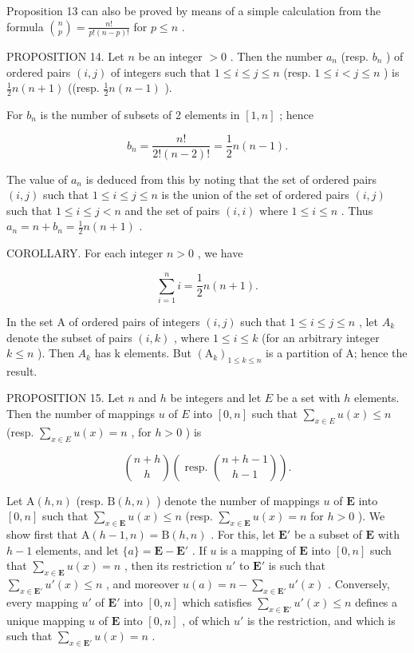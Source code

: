 Proposition 13 can also be proved by means of a simple calculation from the formula \(\binom{n}{p} = \frac{n!}{p!(n - p)!}\) for \(p \leqslant n\) .

PROPOSITION 14. Let \(n\) be an integer \(> 0\) . Then the number \(a_{n}\) (resp. \(b_{n}\) ) of ordered pairs \((i, j)\) of integers such that \(1 \leqslant i \leqslant j \leqslant n\) (resp. \(1 \leqslant i < j \leqslant n\) ) is \(\frac{1}{2} n(n + 1)\) ((resp. \(\frac{1}{2} n(n - 1)\) ).

For \(b_{n}\) is the number of subsets of 2 elements in \([1, n]\) ; hence

\[
b _ {n} = \frac {n !}{2 ! (n - 2) !} = \frac {1}{2} n (n - 1).
\]

The value of \(a_{n}\) is deduced from this by noting that the set of ordered pairs \((i, j)\) such that \(1 \leqslant i \leqslant j \leqslant n\) is the union of the set of ordered pairs \((i, j)\) such that \(1 \leqslant i \leqslant j < n\) and the set of pairs \((i, i)\) where \(1 \leqslant i \leqslant n\) . Thus \(a_{n} = n + b_{n} = \frac{1}{2} n(n + 1)\) .

COROLLARY. For each integer \(n > 0\) , we have

\[
\sum_ {i = 1} ^ {n} i = \frac {1}{2} n (n + 1).
\]

In the set A of ordered pairs of integers \((i, j)\) such that \(1 \leqslant i \leqslant j \leqslant n\) , let \(A_{k}\) denote the subset of pairs \((i, k)\) , where \(1 \leqslant i \leqslant k\) (for an arbitrary integer \(k \leqslant n\) ). Then \(A_{k}\) has k elements. But \((\mathrm{A}_{k})_{1 \leqslant k \leqslant n}\) is a partition of A; hence the result.

PROPOSITION 15. Let \(n\) and \(h\) be integers and let \(E\) be a set with \(h\) elements. Then the number of mappings \(u\) of \(E\) into \([0, n]\) such that \(\sum_{x \in E} u(x) \leqslant n\) (resp. \(\sum_{x \in E} u(x) = n\) , for \(h > 0\) ) is

\[
\binom {n + h} {h} \left(\text { resp. } \binom {n + h - 1} {h - 1}\right).
\]

Let \(\mathrm{A}(h, n)\) (resp. \(\mathrm{B}(h, n)\) ) denote the number of mappings \(u\) of \(\mathbf{E}\) into \([0, n]\) such that \(\sum_{x \in \mathbf{E}} u(x) \leqslant n\) (resp. \(\sum_{x \in \mathbf{E}} u(x) = n\) for \(h > 0\) ). We show first that \(\mathrm{A}(h - 1, n) = \mathrm{B}(h, n)\) . For this, let \(\mathbf{E}'\) be a subset of \(\mathbf{E}\) with \(h - 1\) elements, and let \(\{a\} = \mathbf{E} - \mathbf{E}'\) . If \(u\) is a mapping of \(\mathbf{E}\) into \([0, n]\) such that \(\sum_{x \in \mathbf{E}} u(x) = n\) , then its restriction \(u'\) to \(\mathbf{E}'\) is such that \(\sum_{x \in \mathbf{E}'} u'(x) \leqslant n\) , and moreover \(u(a) = n - \sum_{x \in \mathbf{E}'} u'(x)\) . Conversely, every mapping \(u'\) of \(\mathbf{E}'\) into \([0, n]\) which satisfies \(\sum_{x \in \mathbf{E}'} u'(x) \leqslant n\) defines a unique mapping \(u\) of \(\mathbf{E}\) into \([0, n]\) , of which \(u'\) is the restriction, and which is such that \(\sum_{x \in \mathbf{E}'} u(x) = n\) .

